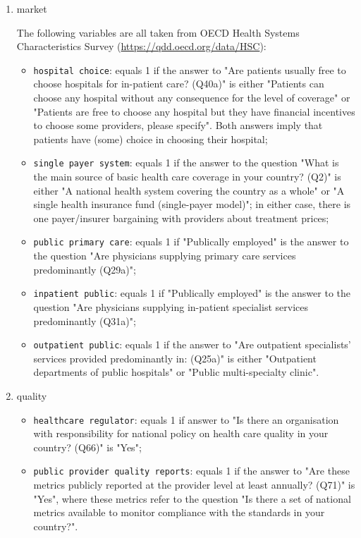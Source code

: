 \documentclass{article}
\begin{document}
\begin{enumerate}
\item market
\label{sec:org8412a87}

The following variables are all taken from OECD Health Systems Characteristics Survey (\url{https://qdd.oecd.org/data/HSC}):
\begin{itemize}
\item \texttt{hospital choice}: equals 1 if the answer to "Are patients usually free to choose hospitals for in-patient care? (Q40a)" is either "Patients can choose any hospital without any consequence for the level of coverage" or "Patients are free to choose any hospital but they have financial incentives to choose some providers, please specify". Both answers imply that patients have (some) choice in choosing their hospital;
\item \texttt{single payer system}: equals 1 if the answer to the question "What is the main source of basic health care coverage in your country? (Q2)" is either "A national health system covering the country as a whole" or "A single health insurance fund (single-payer model)"; in either case, there is one payer/insurer bargaining with providers about treatment prices;
\item \texttt{public primary care}: equals 1 if "Publically employed" is the answer to the question "Are physicians supplying primary care services predominantly (Q29a)";
\item \texttt{inpatient public}: equals 1 if "Publically employed" is the answer to the question "Are physicians supplying in-patient specialist services predominantly (Q31a)";
\item \texttt{outpatient public}: equals 1 if the answer to "Are outpatient specialists' services provided predominantly in: (Q25a)" is either "Outpatient departments of public hospitals" or "Public multi-specialty clinic".
\end{itemize}


\item quality
\label{sec:org430a601}

\begin{itemize}
\item \texttt{healthcare regulator}: equals 1 if answer to "Is there an organisation with responsibility for national policy on health care quality in your country? (Q66)" is "Yes";
\item \texttt{public provider quality reports}: equals 1 if the answer to "Are these metrics publicly reported at the provider level at least annually? (Q71)" is "Yes", where these metrics refer to the question "Is there a set of national metrics available to monitor compliance with the standards in your country?".
\end{itemize}
\end{enumerate}
\end{document}
